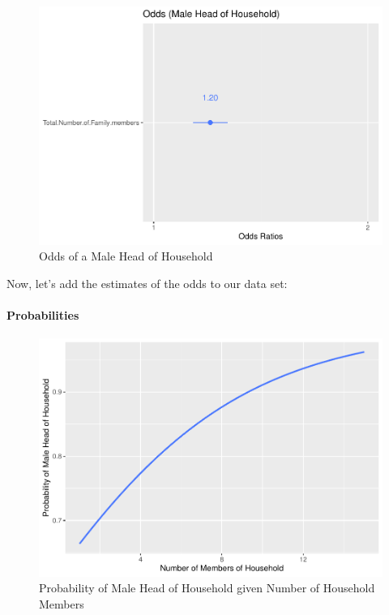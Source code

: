 \documentclass[
]{article}
\begin{document}
\begin{figure}[H]

{\centering \includegraphics[width=0.8\linewidth]{Group_01_Project2_demo_files/figure-latex/model plot-1} 

}

\caption{Odds of a Male Head of Household}\label{fig:model plot}
\end{figure}

Now, let's add the estimates of the odds to our data set:

\hypertarget{probabilities}{%
\paragraph{Probabilities}\label{probabilities}}

\begin{figure}[H]

{\centering \includegraphics[width=0.8\linewidth]{Group_01_Project2_demo_files/figure-latex/probability plot-1} 

}

\caption{Probability of Male Head of Household given Number of Household Members}\label{fig:probability plot}
\end{figure}
\end{document}
